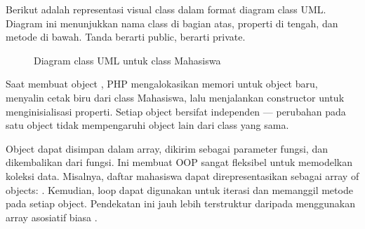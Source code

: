 Berikut adalah representasi visual class  dalam format diagram class UML. Diagram ini menunjukkan nama class di bagian atas, properti di tengah, dan metode di bawah. Tanda \code{+} berarti public, \code{-} berarti private.

\begin{figure}[H]
\centering
{}
\caption{Diagram class UML untuk class Mahasiswa}
\end{figure}

\begin{contoh}
Saat membuat object , PHP mengalokasikan memori untuk object baru, menyalin cetak biru dari class Mahasiswa, lalu menjalankan constructor untuk menginisialisasi properti. Setiap object bersifat independen --- perubahan pada satu object tidak mempengaruhi object lain dari class yang sama.
\end{contoh}

Object dapat disimpan dalam array, dikirim sebagai parameter fungsi, dan dikembalikan dari fungsi. Ini membuat OOP sangat fleksibel untuk memodelkan koleksi data. Misalnya, daftar mahasiswa dapat direpresentasikan sebagai array of objects: . Kemudian, loop  dapat digunakan untuk iterasi dan memanggil metode pada setiap object. Pendekatan ini jauh lebih terstruktur daripada menggunakan array asosiatif biasa \cite{phpRightWay}.

